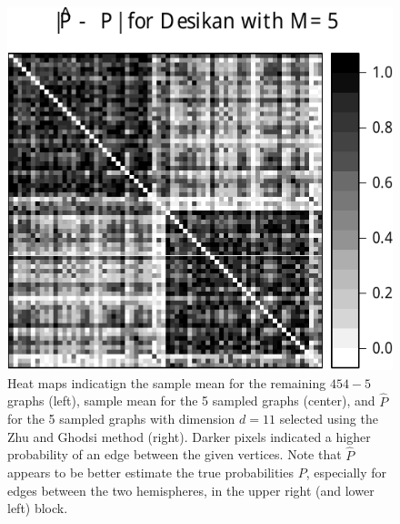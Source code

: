 \documentclass[10pt,letterpaper]{article}
\begin{document}
\begin{figure}[!htb]
\includegraphics[height=.186\textheight]{Phat_desikan_m5.pdf}
\caption{Heat maps indicatign the sample mean for the remaining $454-5$ graphs (left), sample mean for the 5 sampled graphs (center), and $\hat{P}$ for the 5 sampled graphs with dimension $d=11$ selected using the Zhu and Ghodsi method (right).
Darker pixels indicated a higher probability of an edge between the given vertices.
Note that $\hat{P}$ appears to be better estimate the true probabilities $P$, especially for edges between the two hemispheres, in the upper right (and lower left) block.
}
\label{fig:Matrix_desikan_m5}
\end{figure}
\end{document}
